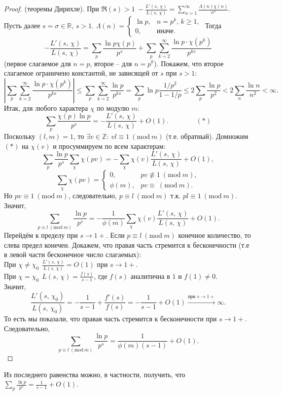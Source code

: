 \begin{proof}(теоремы Дирихле).
	При $\displaystyle \Re(s)>1 \ -\frac{L'(s,\,\chi)}{L(s,\,\chi)} = \sum\limits_{n=1}^\infty \frac{\Lambda(n)\chi(n)}{n^s}$.\\
	Пусть далее $s=\sigma \in \mathbb{R}, \, s>1$. $\Lambda(n) = 
	\begin{cases}
		\ln p, & n=p^k,\,k\geq1,\\
		0, & \text{иначе.}
	\end{cases}$
	Тогда 
	$$-\frac{L'(s,\,\chi)}{L(s,\,\chi)} = \sum\limits_p \frac{\ln p \chi(p)}{p^s} + \sum\limits_p \sum\limits_{k=2}^\infty \frac{\ln p \cdot \chi\left( p^k \right)}{p^{ks}}$$ (первое слагаемое для $n=p$, второе -- для $n=p^k$). Покажем, что второе слагаемое ограничено константой, не зависящей от $s$ при $s>1$:
	$$\left| \sum\limits_p \sum\limits_{k=2}^\infty \frac{\ln p \cdot \chi\left( p^k \right)}{p^{ks}} \right| \leq \sum\limits_p \sum\limits_{k=2}^\infty \frac{\ln p}{p^{ks}} = \sum\limits_p \ln p \frac{1/p^2}{1-1/p} \leq 2\sum\limits_p \frac{\ln p}{p^2} < 2\sum\limits_n \frac{\ln n}{n^2} < \infty.$$
	Итак, для любого характера $\chi$ по модулю $m$:
	$$\sum\limits_p \frac{\chi(p)\ln p}{p^s} = -\frac{L'(s,\,\chi)}{L(s,\,\chi)} + O(1). \qquad \qquad (\ast)$$
	Поскольку $(l, m) =1$, то $\exists v \in \mathbb{Z}: \ vl \equiv 1 \ (\mathrm{mod} \ m)$ (т.е. обратный). 
	Домножим $(\ast)$ на $\chi(v)$ и просуммируем по всем характерам:
	$$\sum\limits_p \frac{\ln p}{p^s} \sum\limits_\chi \chi(pv) = -\sum\limits_\chi \chi(v)\frac{L'(s,\,\chi)}{L(s,\,\chi)} + O(1),$$
	$$\sum\limits_\chi \chi(pv) = 
	\begin{cases}
		0, & pv \not\equiv 1 \ (\mathrm{mod} \ m),\\
		\phi(m), & pv \equiv \ (\mathrm{mod} \ m).
	\end{cases}$$
	Но $pv \equiv 1 \ (\mathrm{mod} \ m)$, следовательно, $p \equiv l \ (\mathrm{mod} \ m)$ т.к. $pl \equiv 1 \ (\mathrm{mod} \ m)$. Значит,
	$$\sum\limits_{p \equiv l \ (\mathrm{mod} \ m)} \frac{\ln p}{p^s} = -\frac{1}{\phi(m)} \sum\limits_\chi \chi(v)\frac{L'(s,\,\chi)}{L(s,\,\chi)} + O(1).$$
	Перейдём к пределу при $s \to 1+$. Если $p \equiv l \ (\mathrm{mod} \ m)$ конечное количество, то слева предел конечен. Докажем, что правая часть стремится к бесконечности (т.е в левой части бесконечное число слагаемых):\\
	При $\displaystyle \chi \ne \chi_0 \ \ \frac{L'(s,\,\chi)}{L(s,\,\chi)} = O(1)$ при $s \to 1+$.\\
	При $\displaystyle \chi = \chi_0 \ \ L(s,\,\chi) = \frac{f(s)}{s-1}$, где $f(s)$ аналитична в $1$ и $f(1) \ne 0$.\\
	Значит,
	$$\frac{L'(s,\,\chi_0)}{L(s,\,\chi_0)} = -\frac{1}{s-1} + \frac{f'(s)}{f(s)} = -\frac{1}{s-1} + O(1) \xrightarrow{\text{при } s\to1+} \infty.$$
	То есть мы показали, что правая часть стремится к бесконечности при $s \to 1+$. Следовательно,
	$$\sum\limits_{p \equiv l \ (\mathrm{mod} \ m)} \frac{\ln p}{p^s} = \frac{1}{\phi(m)(s-1)} + O(1).$$
\end{proof}
Из последнего равенства можно, в частности, получить, что $\displaystyle \sum\limits_p \frac{\ln p}{p^s} = \frac{1}{s-1} + O(1)$.\\

